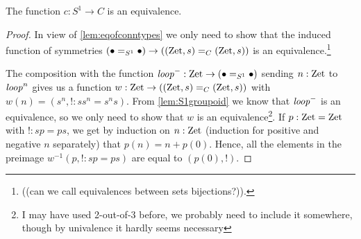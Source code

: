 \begin{remark}
\begin{theorem}\label{thm:S1bysymmetries}
  The function $c:S^1\to C$ is an equivalence.
\end{theorem}
\begin{proof}
  In view of \cref{lem:eqofconntypes} we only need to show that the induced function of symmetries $(\bullet=_{S^1}\bullet)\to((\mathrm{Zet},s)=_C(\mathrm{Zet},s))$ is an equivalence.\footnote{ ((can we call equivalences between sets bijections?)).}  

The composition with the function $\mathit{loop}^-:\mathrm{Zet}\to (\bullet=_{S^1}\bullet)$ sending $n:\mathrm{Zet}$ to $\mathit{loop}^n$ gives us a function $w:\mathrm{Zet}\to((\mathrm{Zet},s)=_C(\mathrm{Zet},s))$ with $w(n)=(s^n,!:ss^n=s^ns)$.  From \cref{lem:S1groupoid} we know that $\mathit{loop}^-$ is an equivalence, so we only need to show that $w$ is an equivalence\footnote{I may have used 2-out-of-3 before, we probably need to include it somewhere, though by univalence it hardly seems necessary}.  If $p:\mathrm{Zet}=\mathrm{Zet}$ with $!:sp=ps$, we get by induction on $n:\mathrm{Zet}$ (induction for positive and negative $n$ separately) that $p(n)=n+p(0)$.  Hence, all the elements in the preimage $w^{-1}(p,!:sp=ps)$ are equal to $(p(0),!)$.  
\end{proof}



\end{remark}

